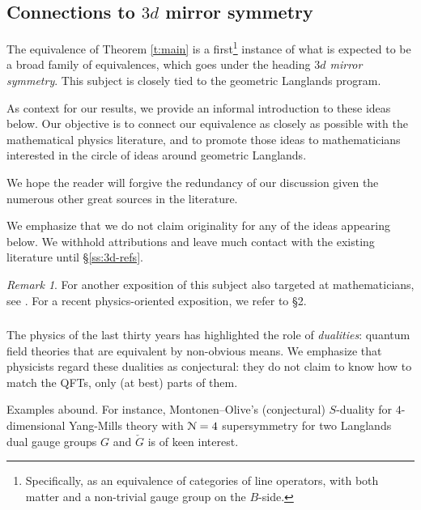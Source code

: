 \documentclass[reqno,11pt]{amsart}
\numberwithin{equation}{subsection}
\theoremstyle{remark}
\newtheorem{rem}[thm]{Remark}
\newcommand{\sN}{{\EuScript N}}
\begin{document}
\subsection{Connections to $3d$ mirror symmetry}

The equivalence of Theorem \ref{t:main} is a first\footnote{Specifically, 
as an equivalence of categories of line operators, with both matter and
a non-trivial gauge group on the $B$-side.}
instance of what is expected to be a broad family of equivalences, 
which goes under the heading
\emph{$3d$ mirror symmetry}. 
This subject is closely tied to the geometric Langlands program.

As context for our results, we
provide an informal introduction to these ideas below.  
Our objective is to connect our equivalence as closely as possible with the 
mathematical physics literature, and to promote those ideas to mathematicians
interested in the circle of ideas around geometric Langlands.

We hope the reader will forgive the 
redundancy of our discussion given 
the numerous other great sources in the literature.

We emphasize that we do not claim originality for any of the ideas
appearing below. We withhold attributions and leave much contact
with the existing literature until \S \ref{ss:3d-refs}.

\begin{rem}

For another exposition of this subject also targeted at mathematicians,
see \cite{bf-notes}. For a recent physics-oriented exposition, we refer
to \cite{dggh} \S 2.

\end{rem}

\subsubsection{}

The physics of the last thirty years has highlighted the role of \emph{dualities}:
quantum field theories that are equivalent by non-obvious means.
We emphasize that
physicists regard these dualities as conjectural: they do not claim
to know how to match the QFTs, only (at best) parts of them.

Examples abound. For instance,
Montonen--Olive's (conjectural) $S$-duality for 
$4$-dimensional Yang-Mills theory with $\sN = 4$ supersymmetry for two 
Langlands dual gauge groups $G$ and $\check{G}$ is of keen interest. 
\end{document}
